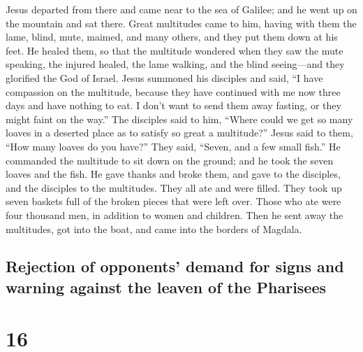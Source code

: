  Jesus departed from there and came near to the sea of
Galilee; and he went up on the mountain and sat there. 
Great multitudes came to him, having with them the lame, blind, mute,
maimed, and many others, and they put them down at his feet. He healed
them,  so that the multitude wondered when they saw the
mute speaking, the injured healed, the lame walking, and the blind
seeing---and they glorified the God of Israel.  Jesus
summoned his disciples and said, ``I have compassion on the multitude,
because they have continued with me now three days and have nothing to
eat. I don't want to send them away fasting, or they might faint on the
way.''  The disciples said to him, ``Where could we get
so many loaves in a deserted place as to satisfy so great a multitude?''
 Jesus said to them, ``How many loaves do you have?''
They said, ``Seven, and a few small fish.''  He commanded
the multitude to sit down on the ground;  and he took the
seven loaves and the fish. He gave thanks and broke them, and gave to
the disciples, and the disciples to the multitudes.  They
all ate and were filled. They took up seven baskets full of the broken
pieces that were left over.  Those who ate were four
thousand men, in addition to women and children.  Then he
sent away the multitudes, got into the boat, and came into the borders
of Magdala.

\hypertarget{rejection-of-opponents-demand-for-signs-and-warning-against-the-leaven-of-the-pharisees}{%
\subsection{Rejection of opponents' demand for signs and warning against
the leaven of the
Pharisees}\label{rejection-of-opponents-demand-for-signs-and-warning-against-the-leaven-of-the-pharisees}}

\hypertarget{section-15}{%
\section{16}\label{section-15}}

